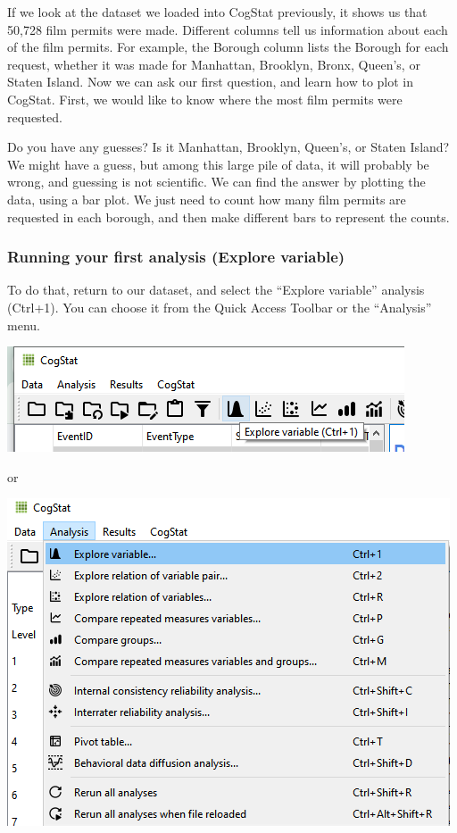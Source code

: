 \documentclass[
]{book}
\begin{document}
If we look at the dataset we loaded into CogStat previously, it shows us that 50,728 film permits were made. Different columns tell us information about each of the film permits. For example, the Borough column lists the Borough for each request, whether it was made for Manhattan, Brooklyn, Bronx, Queen's, or Staten Island. Now we can ask our first question, and learn how to plot in CogStat. First, we would like to know where the most film permits were requested.

Do you have any guesses? Is it Manhattan, Brooklyn, Queen's, or Staten Island? We might have a guess, but among this large pile of data, it will probably be wrong, and guessing is not scientific. We can find the answer by plotting the data, using a bar plot. We just need to count how many film permits are requested in each borough, and then make different bars to represent the counts.

\hypertarget{running-your-first-analysis-explore-variable}{%
\subsubsection{Running your first analysis (Explore variable)}\label{running-your-first-analysis-explore-variable}}

To do that, return to our dataset, and select the ``Explore variable'' analysis (Ctrl+1). You can choose it from the Quick Access Toolbar or the ``Analysis'' menu.

\includegraphics{img/ch1/explorevariable1.png}

or

\includegraphics{img/ch1/explorevariable2.png}
\end{document}

